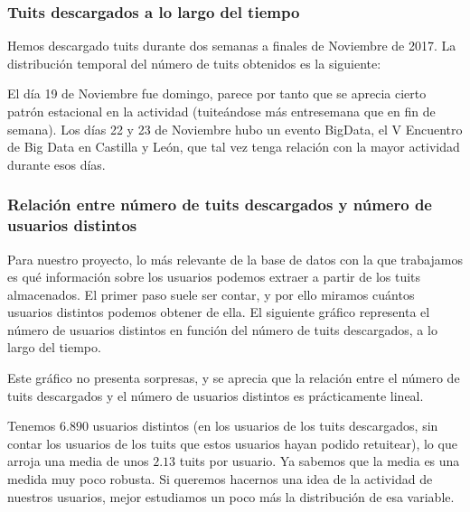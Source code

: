 \subsubsection{Tuits descargados a lo largo del tiempo}
Hemos descargado tuits durante dos semanas a finales de Noviembre de 2017. La distribución
temporal del número de tuits obtenidos es la siguiente:


El día 19 de Noviembre fue domingo, parece por tanto que se aprecia cierto patrón estacional en la actividad
(tuiteándose más entresemana que en fin de semana). Los días 22 y 23 de Noviembre hubo un evento
BigData, el V Encuentro de Big Data en Castilla y León, que tal vez tenga relación con la mayor actividad durante esos días.

\subsubsection{Relación entre número de tuits descargados y número de usuarios distintos}
Para nuestro proyecto, lo más relevante de la base de datos con la que trabajamos es
qué información sobre los usuarios podemos extraer a partir de los tuits almacenados. El primer paso suele ser contar, y por ello miramos cuántos usuarios distintos podemos obtener de ella. 
El siguiente gráfico representa el número de usuarios distintos en función del número de tuits
descargados, a lo largo del tiempo.


Este gráfico no presenta sorpresas, y se aprecia que la relación entre el número de tuits descargados y el número de usuarios distintos es prácticamente lineal.

Tenemos $6.890$ usuarios distintos (en los usuarios de los tuits descargados, sin contar los usuarios de los tuits que estos usuarios hayan podido retuitear), lo que arroja una media de unos $2.13$ tuits por usuario. Ya sabemos que la media es una medida muy poco robusta. Si queremos hacernos una idea de la actividad de nuestros usuarios, mejor estudiamos un poco más la distribución de esa variable.

